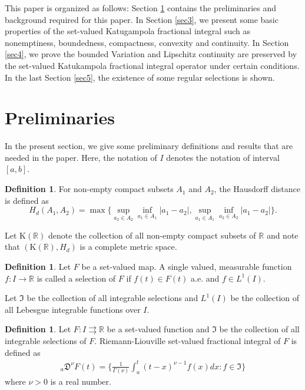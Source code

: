 \documentclass{amsproc}
\theoremstyle{definition}
\newtheorem{definition}[theorem]{Definition}
\theoremstyle{remark}
\numberwithin{equation}{section}
\begin{document}
 This paper is organized as follows: Section \ref{Sec2} contains the preliminaries and background required for this paper. In Section \ref{sec3}, we present some basic properties of the set-valued Katugampola fractional integral such as nonemptiness, boundedness, compactness, convexity and continuity.  In Section \ref{sec4}, we prove the bounded Variation and Lipschitz continuity are preserved by the set-valued Katukampola fractional integral operator under certain conditions. In the last Section \ref{sec5}, the existence of some regular selections is shown. 
 
\section{Preliminaries} \label{Sec2}
In the present section, we give some preliminary definitions and results that are needed in the paper. Here, the notation of $I$ denotes the notation of interval $[a,b].$
\begin{definition}
    For  non-empty compact subsets $A_1$ and $A_2$, the Hausdorff distance is defined as 
    \[ H_d(A_1,A_2) =  \max\big\{\sup_{a_2\in A_2} \inf_{a_1\in A_1}|a_1-a_2|,\sup_{a_1\in A_1} \inf_{a_2\in A_2}|a_1-a_2| \big \}. \]
\end{definition}
Let $\mathrm{K}(\mathbb{R})$ denote the collection of all non-empty compact subsets of $\mathbb{R}$ and note that $(\mathrm{K}(\mathbb{R}),H_d)$ is a complete metric space.  
\begin{definition}
Let $F$ be a set-valued map. A  single valued, measurable function  $f:I \to \mathbb{R}$ is called a selection of $F$ if  $f(t) \in F(t) $ a.e. and $f \in L^1(I).$ 
\end{definition}
Let $\mathfrak{I}$ be the collection of all integrable selections and $L^1(I)$ be the collection of all Lebesgue integrable functions over $I.$ 
\begin{definition}
  Let $F:I\rightrightarrows \mathbb{R}$ be a set-valued function and $\mathfrak{I}$ be the collection of all integrable selections of $F.$ Riemann-Liouville set-valued fractional integral of $F$ is defined as 
    \begin{equation*}
        \begin{aligned}
            _a\mathfrak{D}^{\nu}F(t)=\bigg\{\frac{1}{\Gamma(\nu)}\int_a^t(t-x)^{\nu-1}f(x)dx:f\in\mathfrak{I}\bigg\}
        \end{aligned}
    \end{equation*}
    where $\nu>0$ is a real number.
\end{definition}
\end{document}
